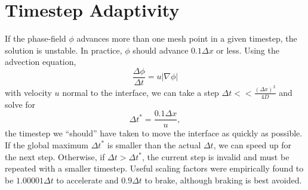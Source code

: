 \documentclass[10pt]{article}
\begin{document}
		


	\section{Timestep Adaptivity}
		If the phase-field $\phi$ advances more than one mesh point in a given timestep, the solution is unstable.
		In practice, $\phi$ should advance $0.1\Delta x$ or less.
		Using the advection equation,
		\begin{equation}
			\frac{\Delta \phi}{\Delta t} = u|\nabla\phi|
		\end{equation}
		with velocity $u$ normal to the interface,
		we can take a step $\Delta t << \frac{(\Delta x)^2}{4D}$
		and solve for
		\begin{equation}
			\Delta t^* = \frac{0.1\Delta x}{u},
		\end{equation}
		the timestep we ``should'' have taken to move the interface as quickly as possible.
		If the global maximum $\Delta t^*$ is smaller than the actual $\Delta t$, we can speed up for the next step.
		Otherwise, if $\Delta t > \Delta t^*$, the current step is invalid and must be repeated with a smaller timestep.
		Useful scaling factors were empirically found to be $1.00001 \Delta t$ to accelerate and $0.9 \Delta t$ to brake,
		although braking is best avoided.
		


	\appendix
	\newpage
\end{document}

